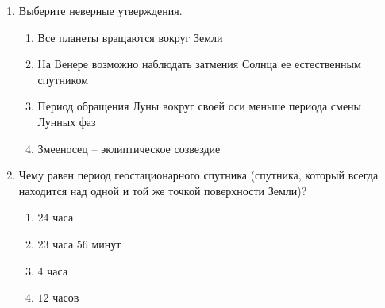 \documentclass[12pt]{article}
\begin{document}
\begin{enumerate}[resume]
	\newpage

	\item Выберите неверные утверждения.
	\begin{multicols}{2}
		\begin{enumerate}[label=\textbf{\Alph*.}]
			\item{Все планеты вращаются вокруг Земли} \item{На Венере возможно наблюдать затмения Солнца ее естественным спутником}
			\item{Период обращения Луны вокруг своей оси меньше периода смены Лунных фаз} \item{Змееносец -- эклиптическое созвездие} 
		\end{enumerate}
	\end{multicols}

	\item Чему равен период геостационарного спутника (спутника, который всегда находится над одной и той же точкой поверхности Земли)?
	\begin{multicols}{2}
		\begin{enumerate}[label=\textbf{\Alph*.}]
			\item{$24$ часа} \item{$23$ часа $56$ минут} 
			\item{$4$ часа} \item{$12$ часов}
		\end{enumerate}
	\end{multicols}
\end{enumerate}
\end{document}
